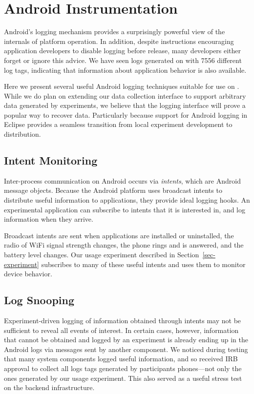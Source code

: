 \section{Android Instrumentation}
\label{sec-logging}


Android's logging mechanism provides a surprisingly powerful view of the
internals of platform operation. In addition, despite instructions
encouraging application developers to disable logging before release, many
developers either forget or ignore this advice. We have seen logs generated
on \PhoneLab{} with \num{7556} different log tags, indicating that
information about application behavior is also available.

Here we present several useful Android logging techniques suitable for use on
\PhoneLab{}. While we do plan on extending our data collection interface to
support arbitrary data generated by experiments, we believe that the logging
interface will prove a popular way to recover data. Particularly because
support for Android logging in Eclipse provides a seamless transition from
local experiment development to \PhoneLab{} distribution.

\subsection{Intent Monitoring}

Inter-process communication on Android occurs via \textit{intents}, which are
Android message objects. Because the Android platform uses broadcast intents
to distribute useful information to applications, they provide ideal logging
hooks. An experimental application can subscribe to intents that it is
interested in, and log information when they arrive.

Broadcast intents are sent when applications are installed or uninstalled,
the radio of WiFi signal strength changes, the phone rings and is answered,
and the battery level changes. Our usage experiment described in
Section~\ref{sec-experiment} subscribes to many of these useful intents and
uses them to monitor device behavior.

\subsection{Log Snooping}

Experiment-driven logging of information obtained through intents may not be
sufficient to reveal all events of interest. In certain cases, however,
information that cannot be obtained and logged by an experiment is already
ending up in the Android logs via messages sent by another component. We
noticed during testing that many system components logged useful information,
and so received IRB approval to collect all logs tags generated by
participants phones---not only the ones generated by our usage experiment.
This also served as a useful stress test on the \PhoneLab{} backend
infrastructure.

